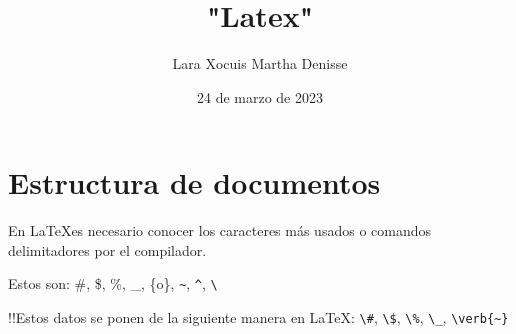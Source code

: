 \documentclass[a4paper,12pt]{article}
\title{\textbf{"Latex"}}
\author{Lara Xocuis Martha Denisse}
\date{24 de marzo de 2023}
\begin{document}
\maketitle
\thispagestyle{empty}
\newpage
\setcounter{page}{1}
\pagestyle{headings}

\section{Estructura de documentos}
En \LaTeX  es necesario conocer los caracteres más usados o comandos delimitadores por el compilador.

\begin{center}
Estos son: \#, \$, \%, \_, \{o\}, \verb|~|, \verb|^|, \verb|\|
\end{center}
!!Estos datos se ponen de la siguiente manera en \LaTeX : \verb|\#|, \verb|\$|, \verb|\%|, \verb|\_|, \verb|\verb{~}|
\end{document}
